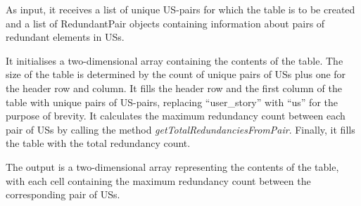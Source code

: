 \begin{enumerate}
	As input, it receives a list of unique US-pairs for which the table is to be created and a list of RedundantPair objects containing information about pairs of redundant elements in USs.
	
	It initialises a two-dimensional array containing the contents of the table. The size of the table is determined by the count of unique pairs of USs plus one for the header row and column. It fills the header row and the first column of the table with unique pairs of US-pairs, replacing \enquote{user\_story} with \enquote{us} for the purpose of brevity. It calculates the maximum redundancy count between each pair of USs by calling the method \textit{getTotalRedundanciesFromPair}. Finally, it fills the table with the total redundancy count. 
	
	The output is a two-dimensional array representing the contents of the table, with each cell containing the maximum redundancy count between the corresponding pair of USs.
		
\end{enumerate}

